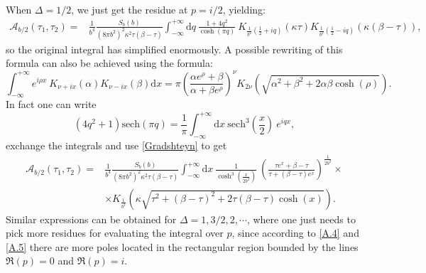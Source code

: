 \documentclass[a4paper,titlepage,12pt]{article}
\numberwithin{equation}{section}
\begin{document}
When $\Delta=1/2$, we just get the residue at $p=i/2$, yielding:
\begin{equation}\label{h=1/2}
\begin{split}
\mathcal{A}_{b/2}(\tau_1,\tau_2)=&\frac{1}{b^4}\frac{S_b( b)}{(8 \pi b^2)^2 \kappa^2 \tau(\beta-\tau)} \int_{-\infty}^{+\infty}  \mathrm{d}q 
\ \frac{1+4q^2}{\cosh \left(\pi  q\right)}  \ K_{\frac{1}{b^2}\left(\frac12+iq\right)}(\kappa \tau)K_{\frac{1}{b^2}\left(\frac12-iq\right)}(\kappa (\beta-\tau)),
\end{split}
\end{equation}
so the original integral has simplified enormously. 
A possible rewriting of this formula can also be achieved using the formula:
\begin{equation}\label{Gradshteyn}
\int_{-\infty}^{+\infty} e^{i \rho x} \ K_{\nu+ix}(\alpha)K_{\nu-ix}(\beta) \mathrm{d}x=\pi \left(\frac{\alpha e^{\rho}+\beta}{\alpha+\beta e^{\rho}}\right)^{\nu} K_{2\nu}\left(\sqrt{\alpha^2+\beta^2+2\alpha \beta \cosh (\rho)}\right).
\end{equation}
In fact one can write 
\begin{equation}
\left(4 q^2+1\right) \text{sech}(\pi  q)=\frac{1}{\pi}\int_{-\infty}^{+\infty} \mathrm{d}x \ \text{sech}^3\left(\frac{x}{2}\right)\ e^{i q x},
\end{equation}
exchange the integrals and use \eqref{Gradshteyn} to get
\begin{equation}\label{h=1/2}
\begin{split}
\mathcal{A}_{b/2}(\tau_1,\tau_2)=&\frac{1}{b^4}\frac{S_b( b)}{(8 \pi b^2)^2 \kappa^2 \tau(\beta-\tau)} \int_{-\infty}^{+\infty}  \mathrm{d}x 
\ \frac{1}{\cosh^3 \left(\frac{x}{2b^2}\right)}  \ \left(\frac{\tau e^{x}+\beta-\tau}{\tau+(\beta-\tau)e^{x}}\right)^{\frac{1}{2b^2}} \times \\
&\times K_{\frac{1}{b^2}}\left(\kappa \sqrt{\tau^2+(\beta-\tau)^2+2 \tau(\beta-\tau)\cosh(x)}\right).
\end{split}
\end{equation}
Similar expressions can be obtained for $\Delta=1,3/2,2,\cdots$, where one just needs to pick more residues for evaluating the integral over $p$, since according to \eqref{A.4} and \eqref{A.5} there are more poles located in the rectangular region bounded by the lines $\Re(p) = 0$ and $\Re(p) = i$.




\end{document}

